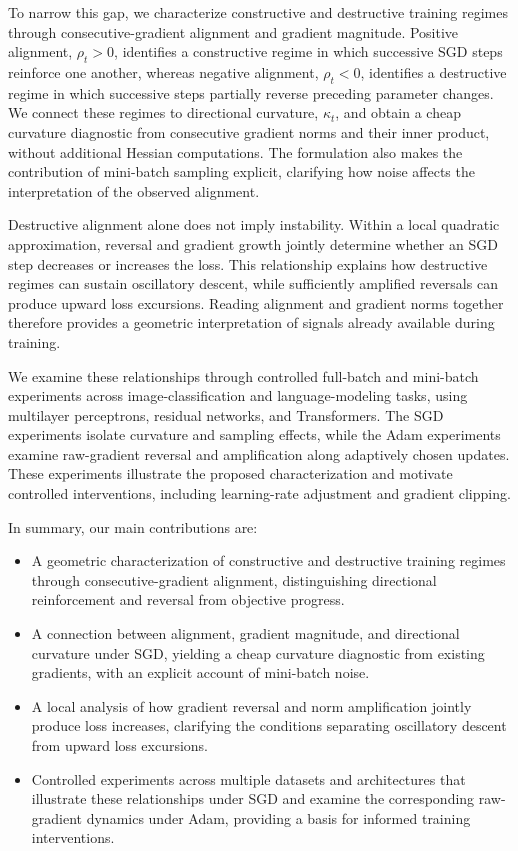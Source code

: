 To narrow this gap, we characterize constructive and destructive training regimes through consecutive-gradient alignment and gradient magnitude. Positive alignment, $\rho_t>0$, identifies a constructive regime in which successive SGD steps reinforce one another, whereas negative alignment, $\rho_t<0$, identifies a destructive regime in which successive steps partially reverse preceding parameter changes. We connect these regimes to directional curvature, $\kappa_t$, and obtain a cheap curvature diagnostic from consecutive gradient norms and their inner product, without additional Hessian computations. The formulation also makes the contribution of mini-batch sampling explicit, clarifying how noise affects the interpretation of the observed alignment.

Destructive alignment alone does not imply instability. Within a local quadratic approximation, reversal and gradient growth jointly determine whether an SGD step decreases or increases the loss. This relationship explains how destructive regimes can sustain oscillatory descent, while sufficiently amplified reversals can produce upward loss excursions. Reading alignment and gradient norms together therefore provides a geometric interpretation of signals already available during training.

We examine these relationships through controlled full-batch and mini-batch experiments across image-classification and language-modeling tasks, using multilayer perceptrons, residual networks, and Transformers. The SGD experiments isolate curvature and sampling effects, while the Adam experiments examine raw-gradient reversal and amplification along adaptively chosen updates. These experiments illustrate the proposed characterization and motivate controlled interventions, including learning-rate adjustment and gradient clipping.


In summary, our main contributions are:
\begin{itemize}
    \item A geometric characterization of constructive and destructive training regimes through consecutive-gradient alignment, distinguishing directional reinforcement and reversal from objective progress.

    \item A connection between alignment, gradient magnitude, and directional curvature under SGD, yielding a cheap curvature diagnostic from existing gradients, with an explicit account of mini-batch noise.

    \item A local analysis of how gradient reversal and norm amplification jointly produce loss increases, clarifying the conditions separating oscillatory descent from upward loss excursions.

    \item Controlled experiments across multiple datasets and architectures that illustrate these relationships under SGD and examine the corresponding raw-gradient dynamics under Adam, providing a basis for informed training interventions.
\end{itemize}

